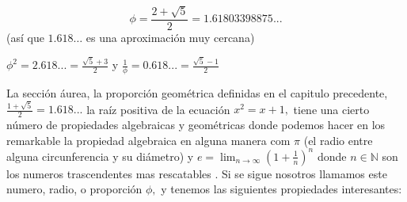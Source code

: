 \documentclass[a4paper]{book}
\newcommand{\qw}{\phi}
\newcommand{\pa}[1]{\left(#1\right)}
\begin{document}
$$\phi=\frac{2+\sqrt{5}}{2}=1.61803398875...$$
(así que $1.618\ldots $ es una aproximación  muy cercana)

$\qw^2=2.618...=\frac{\sqrt{5}+3}{2}$ y
$\frac{1}{\qw}=0.618...=\frac{\sqrt{5}-1}{2}$


La sección áurea, la proporción geométrica definidas en el capitulo precedente, $\frac{1+\sqrt{5}}{2}=1.618...$ la raíz positiva de la ecuación $x^2=x+1,$ tiene una cierto número de propiedades  algebraicas  y geométricas   donde podemos hacer en los remarkable la propiedad algebraica  en alguna manera  com $\pi$ (el radio entre alguna circunferencia y su diámetro) y $e=\lim_{n\longrightarrow \infty}\pa{1+\frac{1}{n}}^n$ donde $n\in \mathbb{N}$ son los numeros trascendentes  mas rescatables  .
Si  se sigue nosotros llamamos este numero, radio, o proporción $\qw,$  y tenemos las siguientes propiedades interesantes:
\end{document}
